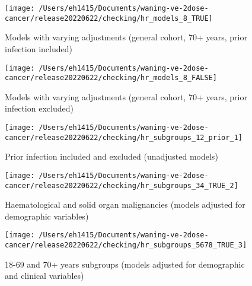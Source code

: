 \documentclass[
  10,
]{article}
\begin{document}
\begin{landscape}
\begin{figure}[H]

{\centering \texttt{[image: /Users/eh1415/Documents/waning-ve-2dose-cancer/release20220622/checking/hr\_models\_8\_TRUE]} 

}

\caption{Models with varying adjustments (general cohort, 70+ years, prior infection included)}\label{fig:unnamed-chunk-16}
\end{figure}

\begin{figure}[H]

{\centering \texttt{[image: /Users/eh1415/Documents/waning-ve-2dose-cancer/release20220622/checking/hr\_models\_8\_FALSE]} 

}

\caption{Models with varying adjustments (general cohort, 70+ years, prior infection excluded)}\label{fig:unnamed-chunk-17}
\end{figure}

\begin{figure}[H]

{\centering \texttt{[image: /Users/eh1415/Documents/waning-ve-2dose-cancer/release20220622/checking/hr\_subgroups\_12\_prior\_1]} 

}

\caption{Prior infection included and excluded (unadjusted models)}\label{fig:unnamed-chunk-18}
\end{figure}

\begin{figure}[H]

{\centering \texttt{[image: /Users/eh1415/Documents/waning-ve-2dose-cancer/release20220622/checking/hr\_subgroups\_34\_TRUE\_2]} 

}

\caption{Haematological and solid organ malignancies (models adjusted for demographic variables)}\label{fig:unnamed-chunk-19}
\end{figure}

\begin{figure}[H]

{\centering \texttt{[image: /Users/eh1415/Documents/waning-ve-2dose-cancer/release20220622/checking/hr\_subgroups\_5678\_TRUE\_3]} 

}

\caption{18-69 and 70+ years subgroups (models adjusted for demographic and clinical variables)}\label{fig:unnamed-chunk-20}
\end{figure}

\end{landscape}
\end{document}
